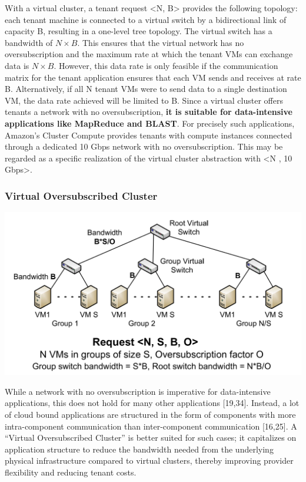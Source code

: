 With a virtual cluster, a tenant request
<N, B> provides the following topology: each tenant
machine is connected to a virtual switch by a bidirectional
link of capacity B, resulting in a one-level tree topology. The
virtual switch has a bandwidth of $N \times B$. This ensures that
the virtual network has no oversubscription and the maximum
rate at which the tenant VMs can exchange data is
$N \times B$. However, this data rate is only feasible if the communication
matrix for the tenant application ensures that each VM sends and receives at rate B. Alternatively, if all N
tenant VMs were to send data to a single destination VM,
the data rate achieved will be limited to B.
Since a virtual cluster offers tenants a network with no
oversubscription, \textbf{it is suitable for data-intensive applications
like MapReduce and BLAST}. For precisely such applications,
Amazon’s Cluster Compute provides tenants with
compute instances connected through a dedicated 10 Gbps
network with no oversubscription. This may be regarded as
a specific realization of the virtual cluster abstraction with
<N , 10 Gbps>.

\subsubsection{Virtual Oversubscribed Cluster}

\includegraphics[width=0.8\linewidth]{img/virt_over_subscribed.png}

While a network with no oversubscription is imperative
for data-intensive applications, this does not hold for many
other applications [19,34]. Instead, a lot of cloud bound applications
are structured in the form of components with
more intra-component communication than inter-component
communication [16,25]. A “Virtual Oversubscribed Cluster”
is better suited for such cases; it capitalizes on application
structure to reduce the bandwidth needed from the underlying
physical infrastructure compared to virtual clusters,
thereby improving provider flexibility and reducing tenant
costs.


